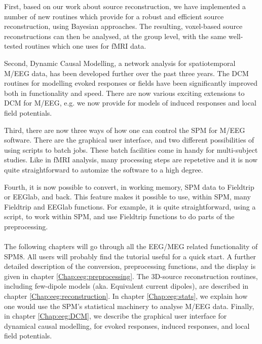 First, based on our work about source reconstruction, we have
implemented a number of new routines which provide for a robust and
efficient source reconstruction, using Bayesian approaches. The
resulting, voxel-based source reconstructions can then be analysed, at
the group level, with the same well-tested routines which one uses for
fMRI data.

Second, Dynamic Causal Modelling, a network analysis for spatiotemporal
M/EEG data, has been developed further over the past three years. The
DCM routines for modelling evoked responses or 
fields have been significantly improved both in functionality and
speed. There are now various exciting extensions to DCM for M/EEG,
e.g. we now provide for models of induced responses and local field
potentials. 

Third, there are now three ways of how one can control the
SPM for M/EEG software. There are the graphical user interface, and two
different possibilities of using scripts to batch jobs. These batch
facilities come in handy for multi-subject studies. Like in fMRI
analysis, many processing steps are repetetive and it is now quite
straightforward to automize the software to a high degree.

Fourth, it is now possible to convert, in working memory, SPM
data to Fieldtrip or EEGlab, and back. This feature makes it possible to 
use, within SPM, many Fieldtrip and EEGlab functions. For example, it
is quite straightforward, using a script, to work within SPM, and use
Fieldtrip functions to do parts of the preprocessing. 
\\
\\
The following chapters will go through all the EEG/MEG related
functionality of SPM8. All users will probably find the tutorial
useful for a quick start. A further detailed description of the
conversion, preprocessing functions, and the display is given in chapter
\ref{Chap:eeg:preprocessing}. The 3D-source reconstruction routines,
including few-dipole models (aka. Equivalent current dipoles), are described in chapter
\ref{Chap:eeg:reconstruction}. In chapter \ref{Chap:eeg:stats}, we
explain how one would use the SPM's statistical machinery to analyse
M/EEG data. Finally, in chapter \ref{Chap:eeg:DCM}, we describe the
graphical user interface for dynamical causal modelling, for evoked  
responses, induced responses, and local field potentials.

